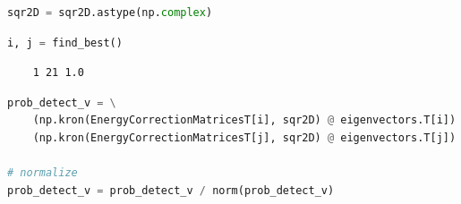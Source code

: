 \begin{lstlisting}[language=Python]
sqr2D = sqr2D.astype(np.complex)
\end{lstlisting}

\begin{lstlisting}[language=Python]
i, j = find_best()
\end{lstlisting}
\begin{lstlisting}
    1 21 1.0
\end{lstlisting}

\begin{lstlisting}[language=Python]
prob_detect_v = \
    (np.kron(EnergyCorrectionMatricesT[i], sqr2D) @ eigenvectors.T[i]) + \
    (np.kron(EnergyCorrectionMatricesT[j], sqr2D) @ eigenvectors.T[j])

# normalize
prob_detect_v = prob_detect_v / norm(prob_detect_v)
\end{lstlisting}

